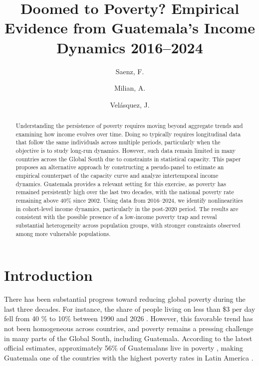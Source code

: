 \documentclass{article}
\title{Doomed to Poverty? Empirical Evidence from Guatemala's Income Dynamics 2016–2024}
\author[1]{Saenz, F.}
\author[2]{Milian, A.}
\author[2]{Velásquez, J.}
\affil[1]{J-PAL LAC, Guatemala City}
\affil[2]{Universidad Rafael Landívar, Guatemala City}
\date{}
\begin{document}
\doublespacing
\maketitle

\begin{abstract}
Understanding the persistence of poverty requires moving beyond aggregate trends and examining how income evolves over time. Doing so typically requires longitudinal data that follow the same individuals across multiple periods, particularly when the objective is to study long-run dynamics. However, such data remain limited in many countries across the Global South due to constraints in statistical capacity. This paper proposes an alternative approach by constructing a pseudo-panel to estimate an empirical counterpart of the capacity curve and analyze intertemporal income dynamics. Guatemala provides a relevant setting for this exercise, as poverty has remained persistently high over the last two decades, with the national poverty rate remaining above 40\% since 2002. Using data from 2016--2024, we identify nonlinearities in cohort-level income dynamics, particularly in the post-2020 period. The results are consistent with the possible presence of a low-income poverty trap and reveal substantial heterogeneity across population groups, with stronger constraints observed among more vulnerable populations.

\end{abstract}

\newpage

\section{Introduction}
There has been substantial progress toward reducing global poverty during the last three decades. For instance, the share of people living on less than \$3 per day fell from 40 \% to 10\% between 1990 and 2026 \parencite{worldbank2026poverty}. However, this favorable trend has not been homogeneous across countries, and poverty remains a pressing challenge in many parts of the Global South, including Guatemala. According to the latest official estimates, approximately 56\% of Guatemalans live in poverty \parencite{ine2024encovi, mides2024ipm}, making Guatemala one of the countries with the highest poverty rates in Latin America \parencite{worldbank2026guatemala}. 
\end{document}
